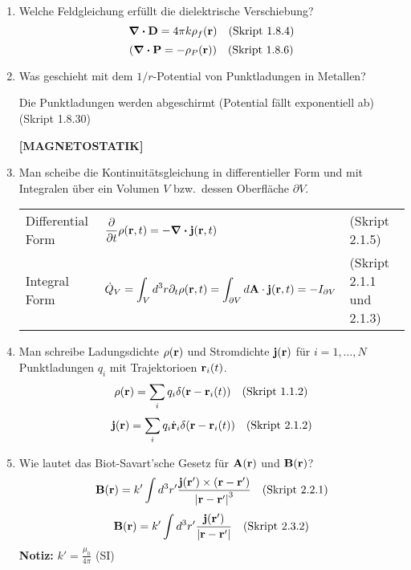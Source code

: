 \documentclass{scrartcl}
\newcommand{\rr}[1]{\frac{#1}{\abs{\vb{r}-\vb{r}'}}}
\newcommand{\ds}{\displaystyle}
\begin{document}
\begin{enumerate}
    \item Welche Feldgleichung erfüllt die dielektrische Verschiebung?
          $$\div \vb D=4\pi k\rho_f(\vb r)\quad\text{(Skript 1.8.4)}$$
          $$\qty(\div \vb P=-\rho_P(\vb r))\quad\text{(Skript 1.8.6)}$$

    \item Was geschieht mit dem $1/r$-Potential von Punktladungen in
          Metallen?
          \begin{center}
            Die Punktladungen werden abgeschirmt (Potential fällt 
            exponentiell ab)
            (Skript 1.8.30)
          \end{center}

    \textbf{[MAGNETOSTATIK]}
    \item Man scheibe die Kontinuitätsgleichung in differentieller Form
          und mit Integralen über ein Volumen $V$ bzw.\ dessen Oberfläche 
          $\partial V$.
          \begin{center}
          \begin{tabular}{lll}
            Differential Form & $\ds\pdv{t}\rho(\vb r, t)=
                                 -\div\vb j(\vb r, t)$
                                & (Skript 2.1.5)\\
            Integral Form     & $\ds\dot Q_V
                                =\int_V d^3r\partial_t\rho(\vb r,t)=
                                \int_{\partial V}d\vb A\cdot
                                \vb j(\vb r, t)=-I_{\partial V}$
                                & (Skript 2.1.1 und 2.1.3)\\
          \end{tabular}
          \end{center}

    \item Man schreibe Ladungsdichte $\rho(\vb r)$ und Stromdichte
          $\vb j(\vb r)$ für $i=1,\ldots,N$ Punktladungen $q_i$ mit 
          Trajektorioen $\vb r_i(t)$.
          $$\rho(\vb r)=\sum_i q_i\delta(\vb r-\vb r_i(t))
          \quad \text{(Skript 1.1.2)}$$
          $$\vb j(\vb r)=\sum_i q_i\dot{\vb r}_i\delta(\vb r-\vb r_i(t))
          \quad \text{(Skript 2.1.2)}$$

    \item Wie lautet das Biot-Savart'sche Gesetz für $\vb A(\vb r)$ und
          $\vb B(\vb r)$?
          $$\vb B(\vb r)=k'\int d^3r'\frac{\vb j(\vb r')\times
          (\vb r-\vb r')}{\abs{\vb r-\vb r'}^3}
          \quad \text{(Skript 2.2.1)}$$
          $$\vb B(\vb r)=k'\int d^3r'\rr{\vb j(\vb r')}
          \quad \text{(Skript 2.3.2)}$$
          \textbf{Notiz:} $k'=\frac{\mu_0}{4\pi}$ (SI)


\end{enumerate}
\end{document}
